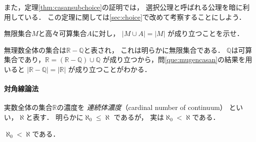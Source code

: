    また，定理\ref{thm:casansubchoice}の証明では，
   選択公理と呼ばれる公理を暗に利用している．
   この定理に関しては\ref{sec:choice}で改めて考察することにしよう．
   

   \begin{que} \label{que:mugencasan}
     無限集合$M$と高々可算集合$A$に対し，
     $\lvert M \cup A \rvert = \lvert M \rvert$
     が成り立つことを示せ．
   \end{que}

   無理数全体の集合は$\mathbb{R} - \mathbb{Q}$と表され，
   これは明らかに無限集合である．
   $\mathbb{Q}$は可算集合であり，$\mathbb{R} = ( \mathbb{R} - \mathbb{Q} ) \cup \mathbb{Q}$
   が成り立つから，問\ref{que:mugencasan}の結果を用いると
     $\lvert \mathbb{R} - \mathbb{Q} \rvert = \lvert \mathbb{R} \rvert$
   が成り立つことがわかる．

  
  \paragraph{対角線論法}
   実数全体の集合$\mathbb{R}$の濃度を
   \emph{連続体濃度}（cardinal number of continuum）
   といい，$\aleph$と表す．
   明らかに$\aleph _0 \leq \aleph$
   であるが，
   実は$\aleph _0 < \aleph$である．

   \begin{thm} 
     $\aleph _0 < \aleph$である．
   \end{thm}

